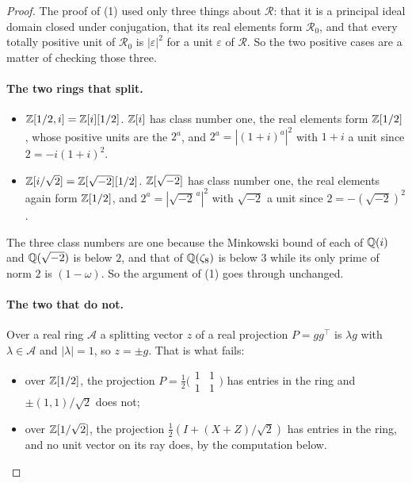 \documentclass[acmsmall,screen,review,anonymous,nonacm]{acmart}
\begin{document}
\stmtRings

\begin{proof}
The proof of (1) used only three things about $\mathcal R$: that it is a
principal ideal domain closed under conjugation, that its real elements form
$\mathcal R_0$, and that every totally positive unit of $\mathcal R_0$ is
$|\varepsilon|^{2}$ for a unit $\varepsilon$ of $\mathcal R$. So the two
positive cases are a matter of checking those three.

\paragraph{The two rings that split.}
\begin{itemize}
\item \emph{$\mathbb{Z}[1/2, i] = \mathbb{Z}[i][1/2]$.} $\mathbb{Z}[i]$ has class number one, the
  real elements form $\mathbb{Z}[1/2]$, whose positive units are the $2^{a}$, and
  $2^{a} = |(1+i)^{a}|^{2}$ with $1+i$ a unit since $2 = -i(1+i)^{2}$.
\item \emph{$\mathbb{Z}[i/\sqrt2] = \mathbb{Z}[\sqrt{-2}][1/2]$.} $\mathbb{Z}[\sqrt{-2}]$ has class
  number one, the real elements again form $\mathbb{Z}[1/2]$, and $2^{a} =
  |\sqrt{-2}^{\,a}|^{2}$ with $\sqrt{-2}$ a unit since $2 = -(\sqrt{-2})^{2}$.
\end{itemize}
The three class numbers are one because the Minkowski bound of each of
$\mathbb{Q}(i)$ and $\mathbb{Q}(\sqrt{-2})$ is below $2$, and that of $\mathbb{Q}(\zeta_8)$ is below
$3$ while its only prime of norm $2$ is $(1-\omega)$. So the argument of (1)
goes through unchanged.

\paragraph{The two that do not.} Over a real ring $\mathcal A$ a splitting
vector $z$ of a real projection $P = gg^{\top}$ is $\lambda g$ with $\lambda
\in \mathcal A$ and $|\lambda| = 1$, so $z = \pm g$. That is what fails:
\begin{itemize}
\item over $\mathbb{Z}[1/2]$, the projection $P = \tfrac12\bigl(\begin{smallmatrix}
  1 & 1 \\ 1 & 1\end{smallmatrix}\bigr)$ has entries in the ring and $\pm(1,
  1)/\sqrt2$ does not;
\item over $\mathbb{Z}[1/\sqrt2]$, the projection $\tfrac12(I + (X+Z)/\sqrt2)$ has
  entries in the ring, and no unit vector on its ray does, by the computation
  below.
\end{itemize}
\end{proof}
\end{document}
